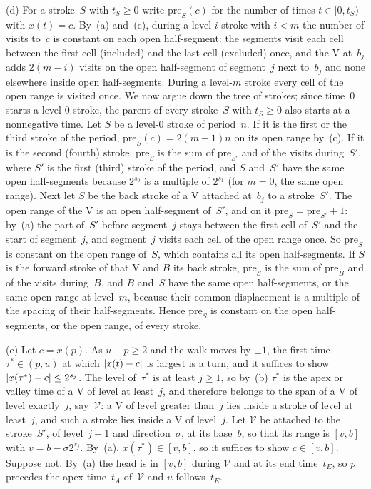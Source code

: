 \begin{informalproof}
(d) For a stroke~$S$ with $t_S\ge0$ write $\mathrm{pre}_S(c)$ for the number of times $t\in[0,t_S)$ with $x(t)=c$.
By~(a) and~(c), during a level-$i$ stroke with $i<m$ the number of visits to~$c$ is constant on each open
half-segment: the segments visit each cell between the first cell (included) and the last cell (excluded) once, and
the V at~$b_j$ adds $2(m-i)$ visits on the open half-segment of segment~$j$ next to~$b_j$ and none elsewhere inside
open half-segments. During a level-$m$ stroke every cell of the open range is visited once. We now argue down the
tree of strokes; since time~$0$ starts a level-$0$ stroke, the parent of every stroke~$S$ with $t_S\ge0$ also starts at a
nonnegative time. Let $S$ be a level-$0$ stroke of period~$n$. If it is the first or the third stroke of the period,
$\mathrm{pre}_S(c)=2(m+1)n$ on its open range by~(c). If it is the second (fourth) stroke, $\mathrm{pre}_S$ is the sum
of $\mathrm{pre}_{S'}$ and of the visits during~$S'$, where $S'$ is the first (third) stroke of the period, and $S$
and~$S'$ have the same open half-segments because $2^{s_0}$ is a multiple of $2^{s_1}$ (for $m=0$, the same open range). Next let $S$ be the back
stroke of a V attached at~$b_j$ to a stroke~$S'$. The open range of the V is an open half-segment of~$S'$, and on it
$\mathrm{pre}_S=\mathrm{pre}_{S'}+1$: by~(a) the part of~$S'$ before segment~$j$ stays between the first cell of~$S'$
and the start of segment~$j$, and segment~$j$ visits each cell of the open range once. So $\mathrm{pre}_S$ is constant
on the open range of~$S$, which contains all its open half-segments. If $S$ is the forward stroke of that V and $B$ its
back stroke, $\mathrm{pre}_S$ is the sum of $\mathrm{pre}_B$ and of the visits during~$B$, and $B$ and~$S$ have the
same open half-segments, or the same open range at level~$m$, because their common displacement is a multiple of the
spacing of their half-segments. Hence $\mathrm{pre}_S$ is constant on the open half-segments, or the open range, of every
stroke.

(e) Let $c=x(p)$. As $u-p\ge2$ and the walk moves by $\pm1$, the first time $\tau^*\in(p,u)$ at which $\lvert x(t)-c \rvert$
is largest is a turn, and it suffices to show $\lvert x(\tau^*)-c \rvert\le2^{s_j}$. The level of~$\tau^*$ is at least
$j\ge1$, so by~(b) $\tau^*$ is the apex or valley time of a V of level at least~$j$, and therefore belongs to the span
of a V of level exactly~$j$, say~$\mathcal V$: a V of level greater than~$j$ lies inside a stroke of level at
least~$j$, and such a stroke lies inside a V of level~$j$. Let $\mathcal V$ be attached to the stroke~$S'$, of
level~$j-1$ and direction~$\sigma$, at its base~$b$, so that its range is $[v,b]$ with $v=b-\sigma2^{s_j}$. By~(a),
$x(\tau^*)\in[v,b]$, so it suffices to show $c\in[v,b]$. Suppose not. By~(a) the head is in $[v,b]$ during
$\mathcal V$ and at its end time~$t_E$, so $p$ precedes the apex time~$t_A$ of~$\mathcal V$ and $u$ follows~$t_E$.


\end{informalproof}
